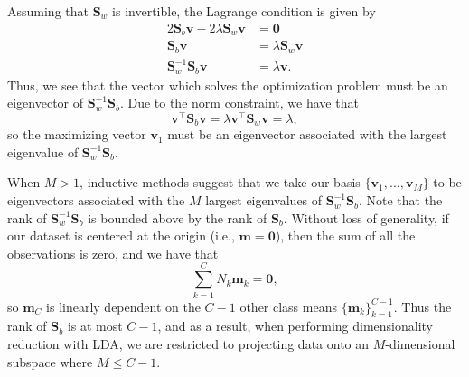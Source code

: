 \documentclass[letterpaper, 10 pt, conference]{ieeeconf}  %
\newcommand{\ve}[1]{\mathbf{#1}}
\begin{document}
Assuming that $\ve{S}_w$ is invertible, the Lagrange condition is given by 
\begin{align*}
    2\ve{S}_b\ve{v} - 2\lambda\ve{S}_w\ve{v} &= \ve{0} \\
    \ve{S}_b\ve{v} &= \lambda\ve{S}_w\ve{v} \\
    \ve{S}_w^{-1}\ve{S}_b\ve{v} &= \lambda\ve{v}.
\end{align*}
Thus, we see that the vector which solves the optimization problem must be an eigenvector of $\ve{S}_w^{-1}\ve{S}_b$. Due to the norm constraint, we have that $$\ve{v}^{\top}\ve{S}_b\ve{v} = \lambda\ve{v}^{\top}\ve{S}_w\ve{v} = \lambda,$$ so the maximizing vector $\ve{v}_1$ must be an eigenvector associated with the largest eigenvalue of $\ve{S}_w^{-1}\ve{S}_b$. 

When $M > 1$, inductive methods suggest that we take our basis $\{\ve{v}_1,\ldots,\ve{v}_M\}$ to be eigenvectors associated with the $M$ largest eigenvalues of $\ve{S}_w^{-1}\ve{S}_b$. Note that the rank of $\ve{S}_w^{-1}\ve{S}_b$ is bounded above by the rank of $\ve{S}_b$. 
Without loss of generality, if our dataset is centered at the origin (i.e., $\ve{m}=\ve{0}$),
then the sum of all the observations is zero, and we have that
$$\sum\limits_{k=1}^C N_k\ve{m}_k = \ve{0},$$ 
so $\ve{m}_C$ is linearly dependent on the $C-1$ other class means $\{\ve{m}_k\}_{k=1}^{C-1}$. Thus the rank of 
$\ve{S}_b$ is at most $C - 1$, and as a result,
when performing dimensionality reduction with LDA, we are restricted to projecting data onto an $M$-dimensional subspace where $M \leq C - 1$.
\end{document}
